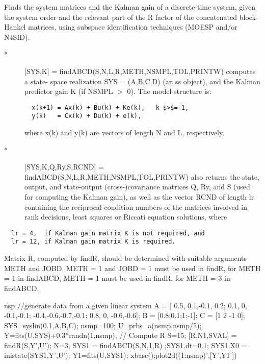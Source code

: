 \begin{mandescription}
  Finds the system matrices and the Kalman gain of a discrete-time 
  system, given the system order and the relevant part of the 
  R factor of the concatenated block-Hankel matrices, using subspace 
  identification techniques (MOESP and/or N4SID).
  \begin{description}
  \item[*] [SYS,K] = findABCD(S,N,L,R,METH,NSMPL,TOL,PRINTW)  computes a state- space realization SYS = (A,B,C,D) (an ss object), and the Kalman predictor gain K (if NSMPL $>$ 0). The model structure is:
\begin{verbatim}
  x(k+1) = Ax(k) + Bu(k) + Ke(k),   k $>$= 1,
  y(k)   = Cx(k) + Du(k) + e(k),
\end{verbatim}
where x(k) and y(k) are vectors of length N and L, respectively.
\item[*] [SYS,K,Q,Ry,S,RCND] = findABCD(S,N,L,R,METH,NSMPL,TOL,PRINTW)  also returns the state, output, and state-output (cross-)covariance matrices Q, Ry, and S (used for computing the Kalman gain), as well as the vector RCND of length lr containing the reciprocal condition numbers of the matrices involved in rank decisions, least squares or Riccati equation solutions, where 
  \end{description}
\begin{verbatim}
  lr = 4,  if Kalman gain matrix K is not required, and
  lr = 12, if Kalman gain matrix K is required.
\end{verbatim}
Matrix R, computed by findR, should be determined with suitable arguments
METH and JOBD.  METH = 1 and JOBD = 1 must be used in findR, for METH = 1 
in findABCD;  METH = 1 must be used in findR, for METH = 3 in findABCD.
\end{mandescription}
\begin{examples}
  \begin{mintednsp}{nsp}
    //generate data from a given linear system
    A = [ 0.5, 0.1,-0.1, 0.2;
      0.1, 0,  -0.1,-0.1;      
      -0.4,-0.6,-0.7,-0.1;  
      0.8, 0,  -0.6,-0.6];      
    B = [0.8;0.1;1;-1];
    C = [1 2 -1 0];
    SYS=syslin(0.1,A,B,C);
    nsmp=100;
    U=prbs_a(nsmp,nsmp/5);
    Y=flts(U,SYS)+0.3*randn(1,nsmp);
    // Compute R
    S=15;
    [R,N1,SVAL] = findR(S,Y',U');
    N=3;
    SYS1 = findABCD(S,N,1,R) ;SYS1.dt=0.1;
    SYS1.X0 = inistate(SYS1,Y',U');
    Y1=flts(U,SYS1);
    xbasc();plot2d((1:nsmp)',[Y',Y1'])
  \end{mintednsp}
\end{examples}
\begin{manseealso}
         
\end{manseealso}
